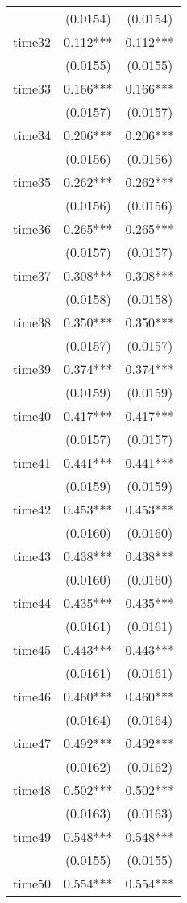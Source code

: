 \documentclass[]{article}
\begin{document}
\begin{tabular}{lcc}
 & (0.0154) & (0.0154) \\
time32 & 0.112*** & 0.112*** \\
 & (0.0155) & (0.0155) \\
time33 & 0.166*** & 0.166*** \\
 & (0.0157) & (0.0157) \\
time34 & 0.206*** & 0.206*** \\
 & (0.0156) & (0.0156) \\
time35 & 0.262*** & 0.262*** \\
 & (0.0156) & (0.0156) \\
time36 & 0.265*** & 0.265*** \\
 & (0.0157) & (0.0157) \\
time37 & 0.308*** & 0.308*** \\
 & (0.0158) & (0.0158) \\
time38 & 0.350*** & 0.350*** \\
 & (0.0157) & (0.0157) \\
time39 & 0.374*** & 0.374*** \\
 & (0.0159) & (0.0159) \\
time40 & 0.417*** & 0.417*** \\
 & (0.0157) & (0.0157) \\
time41 & 0.441*** & 0.441*** \\
 & (0.0159) & (0.0159) \\
time42 & 0.453*** & 0.453*** \\
 & (0.0160) & (0.0160) \\
time43 & 0.438*** & 0.438*** \\
 & (0.0160) & (0.0160) \\
time44 & 0.435*** & 0.435*** \\
 & (0.0161) & (0.0161) \\
time45 & 0.443*** & 0.443*** \\
 & (0.0161) & (0.0161) \\
time46 & 0.460*** & 0.460*** \\
 & (0.0164) & (0.0164) \\
time47 & 0.492*** & 0.492*** \\
 & (0.0162) & (0.0162) \\
time48 & 0.502*** & 0.502*** \\
 & (0.0163) & (0.0163) \\
time49 & 0.548*** & 0.548*** \\
 & (0.0155) & (0.0155) \\
time50 & 0.554*** & 0.554*** \\

\end{tabular}
\end{document}
